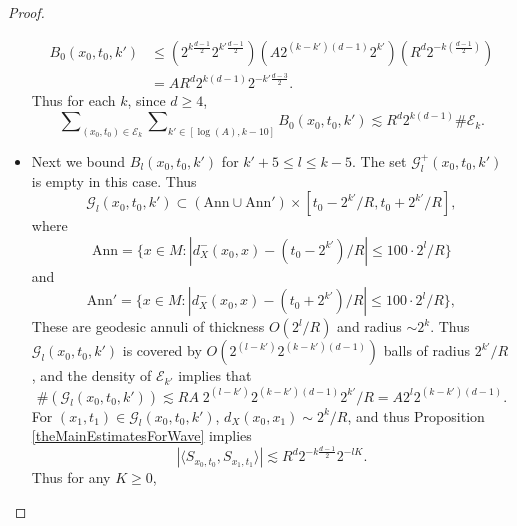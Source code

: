 \begin{proof}
\begin{itemize}
    \begin{align*}
        B_0(x_0,t_0,k') &\leq (2^{k \frac{d-1}{2}} 2^{k' \frac{d-1}{2}}) ( A 2^{(k-k')(d-1)} 2^{k'} )  ( R^d 2^{-k \left( \frac{d-1}{2} \right)} )\\
        &= A R^d 2^{k(d-1)} 2^{-k' \frac{d-3}{2}}.
    \end{align*}
    Thus for each $k$, since $d \geq 4$,
    \begin{equation} \label{AAAlowbounds}
        \sum\nolimits_{(x_0,t_0) \in \mathcal{E}_k} \sum\nolimits_{k' \in [\log(A), k - 10]} B_0(x_0,t_0,k') \lesssim R^{d} 2^{k (d-1)} \# \mathcal{E}_k.
    \end{equation}

    \item Next we bound $B_l(x_0,t_0,k')$ for $k' + 5 \leq l \leq k - 5$. The set $\mathcal{G}_l^+(x_0,t_0,k')$ is empty in this case. Thus
    \begin{equation}
        \mathcal{G}_l(x_0,t_0,k') \subset ( \text{Ann} \cup \text{Ann}' ) \times [t_0 - 2^{k'} / R, t_0 + 2^{k'} / R],
    \end{equation}
    where
    \begin{equation}
        \text{Ann} = \{ x \in M: |d_X^-(x_0,x) - (t_0 - 2^{k'}) / R| \leq 100 \cdot 2^l / R \}
    \end{equation}
    and
    \begin{equation}
        \text{Ann}' = \{ x \in M: |d_X^-(x_0,x) - (t_0 + 2^{k'}) / R| \leq 100 \cdot 2^l / R \},
    \end{equation}
    These are geodesic annuli of thickness $O(2^l / R)$ and radius $\sim 2^k$. Thus $\mathcal{G}_l(x_0,t_0,k')$ is covered by $O( 2^{(l-k')} 2^{(k-k')(d-1)} )$ balls of radius $2^{k'} / R$, and the density of $\mathcal{E}_{k'}$ implies that
    \begin{equation}
        \#(\mathcal{G}_l(x_0,t_0,k')) \lesssim R A\; 2^{(l-k')} 2^{(k-k')(d-1)} 2^{k'} / R = A 2^{l} 2^{(k-k')(d-1)}.
    \end{equation}
    For $(x_1,t_1) \in \mathcal{G}_l(x_0,t_0,k')$, $d_X(x_0,x_1) \sim 2^k / R$, and thus Proposition \ref{theMainEstimatesForWave} implies
    \begin{equation}
        |\langle {S\!}_{x_0,t_0}, {S\!}_{x_1,t_1} \rangle| \lesssim R^d 2^{-k \frac{d-1}{2}} 2^{-lK}.
    \end{equation}
    Thus for any $K \geq 0$,
    \begin{equation}

\end{equation}
\end{itemize}
\end{proof}
